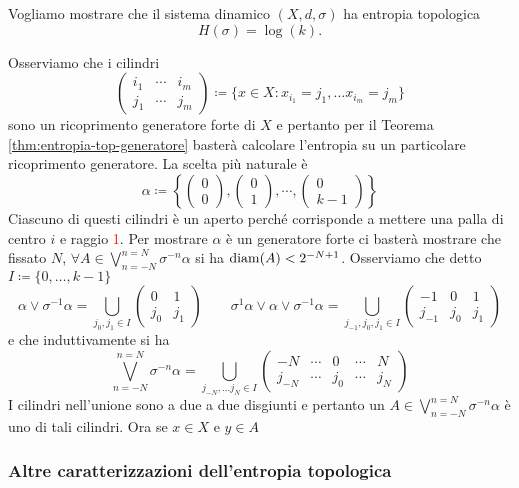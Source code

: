 Vogliamo mostrare che il sistema dinamico $ (X, d, \sigma) $ ha entropia topologica
\[
    H(\sigma) = \log{(k)}.
\]

Osserviamo che i cilindri
\[
    \begin{pmatrix}
    i_1 & \cdots & i_m \\
    j_1 & \cdots & j_m
    \end{pmatrix}
    \coloneqq
    \{x \in X : x_{i_1} = j_1, \ldots x_{i_m} = j_m\}
\]
sono un ricoprimento generatore forte di $ X $ e pertanto per il Teorema \ref{thm:entropia-top-generatore} basterà calcolare l'entropia su un particolare ricoprimento generatore. La scelta più naturale è
\[
    \alpha \coloneqq \left\{
    \begin{pmatrix}
    0 \\ 0
    \end{pmatrix}
    ,
    \begin{pmatrix}
    0 \\ 1
    \end{pmatrix}
    , \cdots ,
    \begin{pmatrix}
    0 \\ k-1
    \end{pmatrix}
    \right\}
\]
Ciascuno di questi cilindri è un aperto perché corrisponde a mettere una palla di centro $ i $ e raggio \textcolor{red}{1}. Per mostrare $ \alpha $ è un generatore forte ci basterà mostrare che fissato $ N $, $ \forall A \in \bigvee_{n=-N}^{n=N}\sigma^{-n}\alpha $ si ha $ \mathrm{diam}{(A)} < 2^{-N+1} $. Osserviamo che detto $ I \coloneqq \{0, \ldots, k-1\} $
\[
    \alpha \vee \sigma^{-1}\alpha = \bigcup_{j_0, j_1 \in I}
    \begin{pmatrix}
    0 & 1 \\
    j_0 & j_1
    \end{pmatrix}
    \qquad
    \sigma^{1}\alpha \vee \alpha \vee \sigma^{-1}\alpha = \bigcup_{j_{-1}, j_0, j_1 \in I}
    \begin{pmatrix}
    -1 & 0 & 1 \\
    j_{-1} & j_0 & j_1
    \end{pmatrix}
\]
e che induttivamente si ha
\[
    \bigvee_{n=-N}^{n=N}\sigma^{-n}\alpha = \bigcup_{j_{-N}, \ldots j_{N} \in I}
    \begin{pmatrix}
    -N & \cdots & 0 & \cdots & N \\
    j_{-N} & \cdots & j_0 & \cdots & j_N
    \end{pmatrix}
\]
I cilindri nell'unione sono a due a due disgiunti e pertanto un $ A \in \bigvee_{n=-N}^{n=N}\sigma^{-n}\alpha $ è uno di tali cilindri. Ora se $ x \in X $ e $ y \in A $

\subsubsection{Altre caratterizzazioni dell'entropia topologica}
